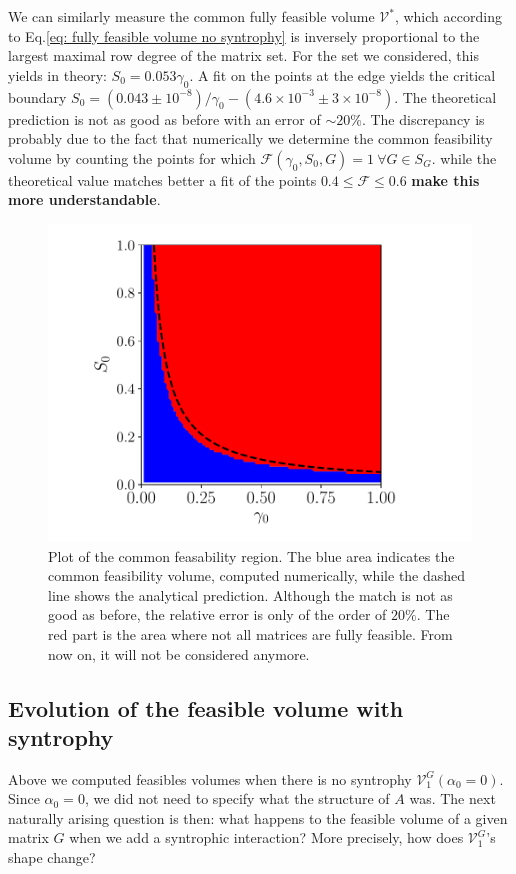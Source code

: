 \documentclass[12pt, titlepage]{report}
\begin{document}
We can similarly measure the common fully feasible volume $\mathcal{V^*}$, which according to Eq.\eqref{eq: fully feasible volume no syntrophy} is inversely proportional to the largest maximal row degree of the matrix set. For the set we considered, this yields in theory: $S_0 = 0.053 \gamma_0$. A fit on the points at the edge yields the critical boundary $S_0 = (0.043 \pm 10^{-8})/\gamma_0 - (4.6 \times 10^{-3} \pm 3 \times 10^{-8})$. The theoretical prediction is not as good as before with an error of $\sim 20 \%$. The discrepancy is probably due to the fact that numerically we determine the common feasibility volume by counting the points for which $\mathcal{F}(\gamma_0, S_0, G)=1 \ \forall G \in S_G$.
while the theoretical value matches better a fit of the points $0.4 \leq \mathcal{F} \leq 0.6$ \textbf{make this more understandable}.
\begin{figure}[h!]
\centering
\includegraphics[width=0.7\linewidth]{common_feasibility_volume_no_syntrophy}
\caption{Plot of the common feasability region. The blue area indicates the common feasibility volume, computed numerically, while the dashed line shows the analytical prediction. Although the match is not as good as before, the relative error is only of the order of $20 \%$. The red part is the area where not all matrices are fully feasible. From now on, it will not be considered anymore.}
\label{fig: common feasible volume}
\end{figure}
\FloatBarrier
\subsection{Evolution of the feasible volume with syntrophy}

Above we computed feasibles volumes when there is no syntrophy \ie $\mathcal{V}^{G}_1(\alpha_0=0)$. Since $\alpha_0=0$, we did not need to specify what the structure of $A$ was. The next naturally arising question is then: what happens to the feasible volume of a given matrix $G$ when we add a syntrophic interaction? More precisely, how does $\mathcal{V}^G_1$'s shape change?
\end{document}
